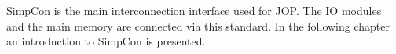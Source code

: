 SimpCon \cite{simpcon} is the main interconnection interface used
for JOP. The IO modules and the main memory are connected via this
standard. In the following chapter an introduction to SimpCon is
presented.
